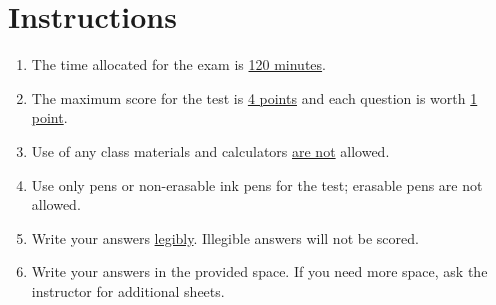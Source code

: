 \section*{Instructions}
\begin{enumerate}
    \item The time allocated for the exam is \underline{120 minutes}.
    \item The maximum score for the test is \underline{4 points} and each question is worth \underline{1 point}. 
    \item Use of any class materials and calculators \underline{are not} allowed.
    \item Use only pens or non-erasable ink pens for the test; erasable pens are not allowed.
    \item Write your answers \underline{legibly}. Illegible answers will not be scored.
    \item Write your answers in the provided space. If you need more space, ask the instructor for additional sheets.
    \vfill
\end{enumerate}